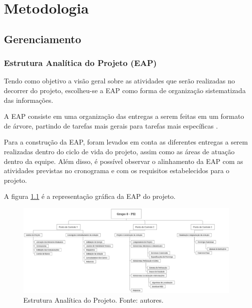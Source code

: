 \chapter{Metodologia}
  \section{Gerenciamento}
    \subsection{Estrutura Analítica do Projeto (EAP)}

      Tendo como objetivo a visão geral sobre as atividades que serão
      realizadas no decorrer do projeto, escolheu-se a EAP como forma
      de organização sistematizada das informações.

      A EAP consiste em uma organização das entregas
      a serem feitas em um formato de árvore, partindo de tarefas
      mais gerais para tarefas mais específicas \cite{pmbok2012}.

      Para a construção da EAP, foram levados em conta as diferentes
      entregas a serem realizadas dentro do ciclo de vida do projeto,
      assim como as áreas de atuação dentro da equipe. Além disso, é
      possível observar o alinhamento da EAP com as atividades previstas
      no cronograma e com os requisitos estabelecidos para o projeto.

      A figura \ref{fig:eap} é a representação gráfica da EAP do projeto.

      \begin{figure}[!htbp]
        \centering
        \includegraphics[width=\textwidth]{figuras/EAP.eps}
        \caption{Estrutura Analítica do Projeto. Fonte: autores.}
        \label{fig:eap}
      \end{figure}

      \vfill
      \pagebreak

